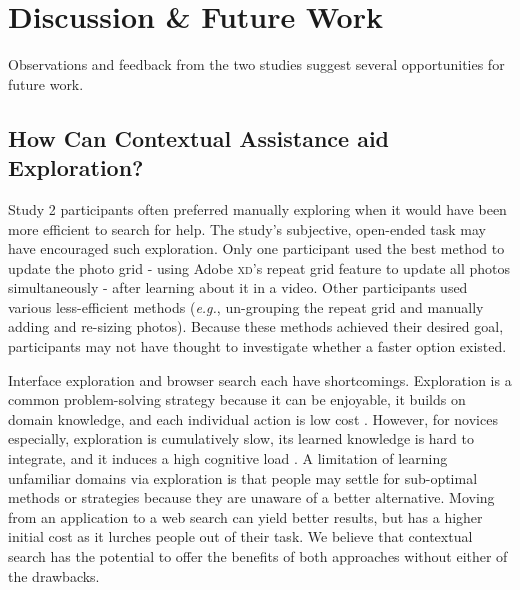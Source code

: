 \section{Discussion \& Future Work}
Observations and feedback from the two studies suggest several opportunities for future work. 

\subsection{How Can Contextual Assistance aid Exploration?}

Study 2 participants often preferred manually exploring when it would have been more efficient to search for help. The study's subjective, open-ended task may have encouraged such exploration. Only one participant used the best method to update the photo grid - using Adobe \textsc{xd}'s repeat grid feature to update all photos simultaneously - after learning about it in a video. Other participants used various less-efficient methods (\textit{e.g.}, un-grouping the repeat grid and manually adding and re-sizing photos). Because these methods achieved their desired goal, participants may not have thought to investigate whether a faster option existed.

Interface exploration and browser search each have shortcomings. Exploration is a common problem-solving strategy because it can be enjoyable, it builds on domain knowledge, and each individual action is low cost \cite{Lafreniere2014a, Rieman1996}. However, for novices especially, exploration is cumulatively slow, its learned knowledge is hard to integrate, and it induces a high cognitive load \cite{Tuovinen1999, Lafreniere2014a}. A limitation of learning unfamiliar domains via exploration is that people may settle for sub-optimal methods or strategies because they are unaware of a better alternative. Moving from an application to a web search can yield better results, but has a higher initial cost as it lurches people out of their task. We believe that contextual search has the potential to offer the benefits of both approaches without either of the drawbacks. 

